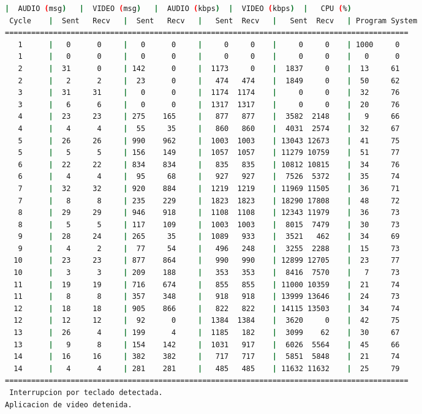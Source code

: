 \begin{adjustbox}{max width=\textwidth}
\begin{lstlisting}[language=bash,basicstyle=\ttfamily\scriptsize]
          |  AUDIO (msg)   |  VIDEO (msg)   |  AUDIO (kbps)  |  VIDEO (kbps)  |   CPU (%)
 Cycle    |  Sent   Recv   |  Sent   Recv   |   Sent  Recv   |   Sent  Recv   | Program System
============================================================================================
   1      |   0      0     |   0      0     |     0     0    |     0     0    | 1000     0
   1      |   0      0     |   0      0     |     0     0    |     0     0    |   0      0
   2      |  31      0     | 142      0     |  1173     0    |  1837     0    |  13     61
   2      |   2      2     |  23      0     |   474   474    |  1849     0    |  50     62
   3      |  31     31     |   0      0     |  1174  1174    |     0     0    |  32     76
   3      |   6      6     |   0      0     |  1317  1317    |     0     0    |  20     76
   4      |  23     23     | 275    165     |   877   877    |  3582  2148    |   9     66
   4      |   4      4     |  55     35     |   860   860    |  4031  2574    |  32     67
   5      |  26     26     | 990    962     |  1003  1003    | 13043 12673    |  41     75
   5      |   5      5     | 156    149     |  1057  1057    | 11279 10759    |  51     77
   6      |  22     22     | 834    834     |   835   835    | 10812 10815    |  34     76
   6      |   4      4     |  95     68     |   927   927    |  7526  5372    |  35     74
   7      |  32     32     | 920    884     |  1219  1219    | 11969 11505    |  36     71
   7      |   8      8     | 235    229     |  1823  1823    | 18290 17808    |  48     72
   8      |  29     29     | 946    918     |  1108  1108    | 12343 11979    |  36     73
   8      |   5      5     | 117    109     |  1003  1003    |  8015  7479    |  30     73
   9      |  28     24     | 265     35     |  1089   933    |  3521   462    |  34     69
   9      |   4      2     |  77     54     |   496   248    |  3255  2288    |  15     73
  10      |  23     23     | 877    864     |   990   990    | 12899 12705    |  23     77
  10      |   3      3     | 209    188     |   353   353    |  8416  7570    |   7     73
  11      |  19     19     | 716    674     |   855   855    | 11000 10359    |  21     74
  11      |   8      8     | 357    348     |   918   918    | 13999 13646    |  24     73
  12      |  18     18     | 905    866     |   822   822    | 14115 13503    |  34     74
  12      |  12     12     |  92      0     |  1384  1384    |  3620     0    |  42     75
  13      |  26      4     | 199      4     |  1185   182    |  3099    62    |  30     67
  13      |   9      8     | 154    142     |  1031   917    |  6026  5564    |  45     66
  14      |  16     16     | 382    382     |   717   717    |  5851  5848    |  21     74
  14      |   4      4     | 281    281     |   485   485    | 11632 11632    |  25     79
============================================================================================
 Interrupcion por teclado detectada.
Aplicacion de video detenida.


\end{lstlisting}
\end{adjustbox}
